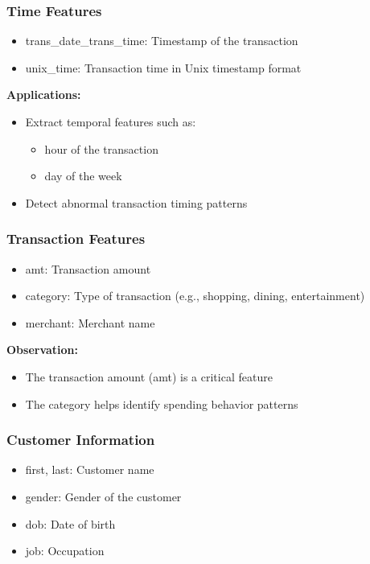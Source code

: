 \subsubsection{Time Features}
\begin{itemize}
    \item trans\_date\_trans\_time: Timestamp of the transaction
    \item unix\_time: Transaction time in Unix timestamp format
\end{itemize}

\textbf{Applications:}
\begin{itemize}
    \item Extract temporal features such as:
    \begin{itemize}
        \item hour of the transaction
        \item day of the week
    \end{itemize}
    \item Detect abnormal transaction timing patterns
\end{itemize}

\subsubsection{Transaction Features}
\begin{itemize}
    \item amt: Transaction amount
    \item category: Type of transaction (e.g., shopping, dining, entertainment)
    \item merchant: Merchant name
\end{itemize}

\textbf{Observation:}
\begin{itemize}
    \item The transaction amount (amt) is a critical feature
    \item The category helps identify spending behavior patterns
\end{itemize}

\subsubsection{Customer Information}
\begin{itemize}
    \item first, last: Customer name
    \item gender: Gender of the customer
    \item dob: Date of birth
    \item job: Occupation
\end{itemize}

